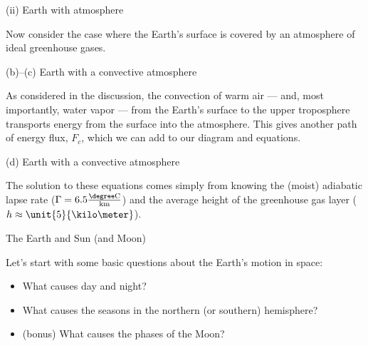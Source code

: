 \documentclass[12pt]{beamer}
\begin{document}
\begin{frame}{(ii) Earth with atmosphere}

Now consider the case where the Earth's surface is covered by an atmosphere of ideal greenhouse gases.

\vspace{7cm}


\end{frame}
\begin{frame}{(b)--(c) Earth with a convective atmosphere}

As considered in the discussion, the convection of warm air --- and, most importantly, water vapor --- from the Earth's surface to the upper troposphere transports energy from the surface into the atmosphere. This gives another path of energy flux, $F_c$, which we can add to our diagram and equations.


\vspace{7cm}

\end{frame}
\begin{frame}{(d) Earth with a convective atmosphere}

The solution to these equations comes simply from knowing the (moist) adiabatic lapse rate ($\Gamma = 6.5 \frac{\degree\text{C}}{\text{km}}$) and the average height of the greenhouse gas layer ($h \approx \unit{5}{\kilo\meter}$).


\vspace{7cm}


\end{frame}
\begin{frame}{The Earth and Sun (and Moon)}

Let's start with some basic questions about the Earth's motion in space:
	\begin{itemize}
	\item What causes day and night?
	\item What causes the seasons in the northern (or southern) hemisphere?
	\item (bonus) What causes the phases of the Moon?
	\end{itemize}


\end{frame}
\end{document}
